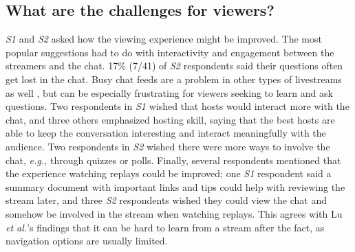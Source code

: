 \subsection{What are the challenges for viewers?}
\textit{S1} and \textit{S2} asked how the viewing experience might be improved. The most popular suggestions had to do with interactivity and engagement between the streamers and the chat. 17\% (7/41) of \textit{S2} respondents said their questions often get lost in the chat. Busy chat feeds are a problem in other types of livestreams as well \cite{Miller2017}, but can be especially frustrating for viewers seeking to learn and ask questions. Two respondents in \textit{S1} wished that hosts would interact more with the chat, and three others emphasized hosting skill, saying that the best hosts are able to keep the conversation interesting and interact meaningfully with the audience. Two respondents in \textit{S2} wished there were more ways to involve the chat, \textit{e.g.,} through quizzes or polls. Finally, several respondents mentioned that the experience watching replays could be improved; one \textit{S1} respondent said a summary document with important links and tips could help with reviewing the stream later, and three \textit{S2} respondents wished they could view the chat and somehow be involved in the stream when watching replays. This agrees with Lu \textit{et al.}'s findings \cite{Lu2018} that it can be hard to learn from a stream after the fact, as navigation options are usually limited.